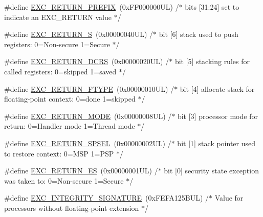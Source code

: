 \begin{DoxyCompactItemize}
\item 
\#define \hyperlink{group___c_m_s_i_s___core___n_v_i_c_functions_ga99e0c1c19f050880a8bd827a7f420bec}{E\+X\+C\+\_\+\+R\+E\+T\+U\+R\+N\+\_\+\+P\+R\+E\+F\+IX}~(0x\+F\+F000000\+U\+L)     /$\ast$ bits \mbox{[}31\+:24\mbox{]} set to indicate an E\+X\+C\+\_\+\+R\+E\+T\+U\+R\+N value                     $\ast$/
\item 
\#define \hyperlink{group___c_m_s_i_s___core___n_v_i_c_functions_ga88711355d0196b1ffeb18c33e2c95360}{E\+X\+C\+\_\+\+R\+E\+T\+U\+R\+N\+\_\+S}~(0x00000040\+U\+L)     /$\ast$ bit \mbox{[}6\mbox{]} stack used to push registers\+: 0=\+Non-\/secure 1=\+Secure          $\ast$/
\item 
\#define \hyperlink{group___c_m_s_i_s___core___n_v_i_c_functions_ga0a0f2c03b4aef2c02bdae044bda1324b}{E\+X\+C\+\_\+\+R\+E\+T\+U\+R\+N\+\_\+\+D\+C\+RS}~(0x00000020\+U\+L)     /$\ast$ bit \mbox{[}5\mbox{]} stacking rules for called registers\+: 0=skipped 1=saved       $\ast$/
\item 
\#define \hyperlink{group___c_m_s_i_s___core___n_v_i_c_functions_ga342b51c3eec59822bf206e24ef881a9e}{E\+X\+C\+\_\+\+R\+E\+T\+U\+R\+N\+\_\+\+F\+T\+Y\+PE}~(0x00000010\+U\+L)     /$\ast$ bit \mbox{[}4\mbox{]} allocate stack for floating-\/point context\+: 0=done 1=skipped  $\ast$/
\item 
\#define \hyperlink{group___c_m_s_i_s___core___n_v_i_c_functions_gabb65f847769a7807395b2739cc9702d0}{E\+X\+C\+\_\+\+R\+E\+T\+U\+R\+N\+\_\+\+M\+O\+DE}~(0x00000008\+U\+L)     /$\ast$ bit \mbox{[}3\mbox{]} processor mode for return\+: 0=\+Handler mode 1=\+Thread mode      $\ast$/
\item 
\#define \hyperlink{group___c_m_s_i_s___core___n_v_i_c_functions_ga686922b26c29eac540f53a6213627466}{E\+X\+C\+\_\+\+R\+E\+T\+U\+R\+N\+\_\+\+S\+P\+S\+EL}~(0x00000002\+U\+L)     /$\ast$ bit \mbox{[}1\mbox{]} stack pointer used to restore context\+: 0=\+M\+S\+P 1=\+P\+S\+P           $\ast$/
\item 
\#define \hyperlink{group___c_m_s_i_s___core___n_v_i_c_functions_gac939dbf69d3063c76a28516a4ae84db7}{E\+X\+C\+\_\+\+R\+E\+T\+U\+R\+N\+\_\+\+ES}~(0x00000001\+U\+L)     /$\ast$ bit \mbox{[}0\mbox{]} security state exception was taken to\+: 0=\+Non-\/secure 1=\+Secure $\ast$/
\item 
\#define \hyperlink{group___c_m_s_i_s___core___n_v_i_c_functions_ga7d1b21b2d863ccd9e23a3295b3173155}{E\+X\+C\+\_\+\+I\+N\+T\+E\+G\+R\+I\+T\+Y\+\_\+\+S\+I\+G\+N\+A\+T\+U\+RE}~(0x\+F\+E\+F\+A125\+B\+U\+L)     /$\ast$ Value for processors without floating-\/point extension                $\ast$/

\end{DoxyCompactItemize}
